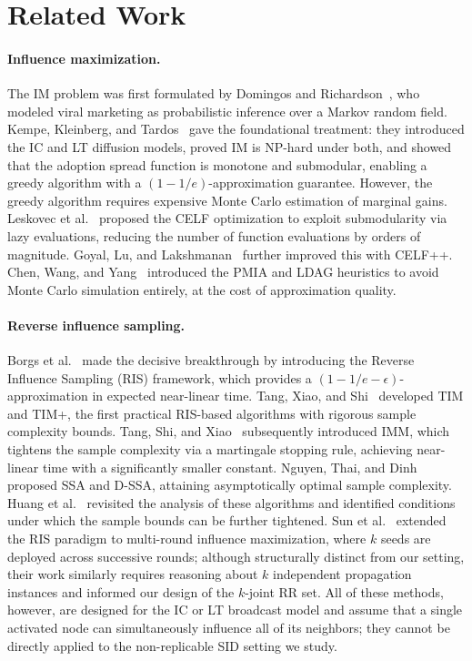 \documentclass[sigconf]{acmart}
\begin{document}
\section{Related Work}

\paragraph{Influence maximization.}
The IM problem was first formulated by Domingos and Richardson~\cite{domingos2001mining,richardson2002mining}, who modeled viral marketing as probabilistic inference over a Markov random field. Kempe, Kleinberg, and Tardos~\cite{kempe2003maximizing} gave the foundational treatment: they introduced the IC and LT diffusion models, proved IM is NP-hard under both, and showed that the adoption spread function is monotone and submodular, enabling a greedy algorithm with a $(1-1/e)$-approximation guarantee. However, the greedy algorithm requires expensive Monte Carlo estimation of marginal gains. Leskovec et al.~\cite{leskovec2007celf} proposed the CELF optimization to exploit submodularity via lazy evaluations, reducing the number of function evaluations by orders of magnitude. Goyal, Lu, and Lakshmanan~\cite{goyal2011celf} further improved this with CELF++. Chen, Wang, and Yang~\cite{chen2009efficient} introduced the PMIA and LDAG heuristics to avoid Monte Carlo simulation entirely, at the cost of approximation quality.

\paragraph{Reverse influence sampling.}
Borgs et al.~\cite{borgs2014maximizing} made the decisive breakthrough by introducing the Reverse Influence Sampling (RIS) framework, which provides a $(1-1/e-\epsilon)$-approximation in expected near-linear time. Tang, Xiao, and Shi~\cite{tang2014influence} developed TIM and TIM+, the first practical RIS-based algorithms with rigorous sample complexity bounds. Tang, Shi, and Xiao~\cite{tang2015influence} subsequently introduced IMM, which tightens the sample complexity via a martingale stopping rule, achieving near-linear time with a significantly smaller constant. Nguyen, Thai, and Dinh~\cite{nguyen2016stop} proposed SSA and D-SSA, attaining asymptotically optimal sample complexity. Huang et al.~\cite{huang2017revisiting} revisited the analysis of these algorithms and identified conditions under which the sample bounds can be further tightened. Sun et al.~\cite{sun2018multi} extended the RIS paradigm to multi-round influence maximization, where $k$ seeds are deployed across successive rounds; although structurally distinct from our setting, their work similarly requires reasoning about $k$ independent propagation instances and informed our design of the $k$-joint RR set. All of these methods, however, are designed for the IC or LT broadcast model and assume that a single activated node can simultaneously influence all of its neighbors; they cannot be directly applied to the non-replicable SID setting we study.
\end{document}
